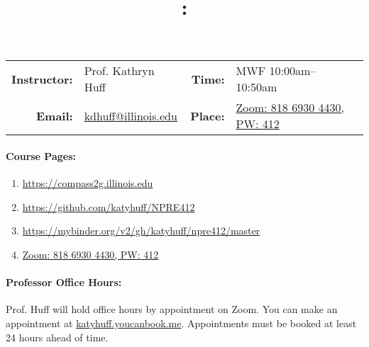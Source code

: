 \documentclass[11pt, a4paper]{article}
\title{\CourseNumber: \CourseTitle\\}
\author{\CourseUniversity}
\date{\CourseSemester \CourseYear}
\makeatletter
\newcommand{\CourseNumber}{NPRE412}
\newcommand{\CourseInstructor}{Prof. Kathryn Huff\xspace}%
\newcommand{\CourseDays}{MWF\xspace}%
\newcommand{\CourseStart}{10:00am\xspace}%
\newcommand{\CourseEnd}{10:50am\xspace}%
\newcommand{\CourseInstructorEmail}{kdhuff@illinois.edu}
\newcommand{\HuffOfficeHourPlace}{\url{https://illinois.zoom.us/my.katyhuff}\xspace}
\newcommand{\CourseRoom}{\href{https://illinois.zoom.us/j/81869304430}{Zoom: 818 6930 4430, PW: 412}\xspace}%
\newcommand{\CourseBuilding}{\xspace}%
\makeatother
\begin{document}
\maketitle
\renewcommand{\arraystretch}{1.5}
\begin{center}
\begin{table}[h]
\begin{tabularx}{\textwidth}{rXrX}
\hline
\textbf{Instructor:} & \CourseInstructor & \textbf{Time:} & \CourseDays \CourseStart -- \CourseEnd \\
\textbf{Email:} &  \href{mailto:\CourseInstructorEmail}{\CourseInstructorEmail} & \textbf{Place:} & \CourseRoom \CourseBuilding\\
\hline
\end{tabularx}
\end{table}
\end{center}

\paragraph{Course Pages:}
\begin{enumerate}
        \item \url{https://compass2g.illinois.edu}
        \item \url{https://github.com/katyhuff/\CourseNumber}
        \item \url{https://mybinder.org/v2/gh/katyhuff/npre412/master}
        \item \CourseRoom
\end{enumerate}




\paragraph{Professor Office Hours:} Prof. Huff will hold office hours by 
appointment on Zoom. You can make an appointment at 
\url{katyhuff.youcanbook.me}. Appointments must be booked at least 24 hours 
ahead of time.
\end{document}
